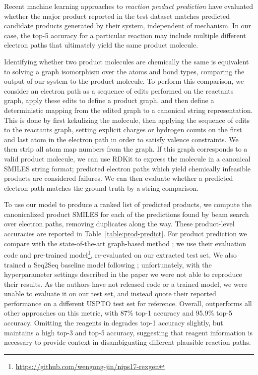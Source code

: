 Recent machine learning approaches to {\em reaction product prediction} \citep{jin2017predicting,schwaller2017found}
have evaluated whether the major product reported in the test dataset matches predicted candidate products generated by their system, independent of mechanism.
In our case, the top-5 accuracy for a particular reaction may include multiple different electron paths that ultimately yield the same product molecule.

Identifying whether two product molecules are chemically the same is equivalent to solving a graph isomorphism over the atoms and bond types, comparing the output of our system to the product molecule.
To perform this comparison, we consider an electron path as a sequence of edits performed on the reactants graph, apply these edits to define a product graph, 
and then define a deterministic mapping from the edited graph to a canonical string representation.
This is done by first kekulizing the molecule, %
then applying the sequence of edits to the reactants graph,
setting explicit charges or hydrogen counts on the first and last atom in the electron path in order to satisfy valence constraints.
We then strip all atom map numbers from the graph.
If this graph corresponds to a valid product molecule, we can use RDKit to express the molecule in a canonical SMILES string format;
predicted electron paths which yield chemically infeasible products are considered failures.
We can then evaluate whether a predicted electron path matches the ground truth by a string comparison.

To use our model to produce a ranked list of predicted products, we compute the canonicalized product SMILES for each of the predictions found by beam search over electron paths, removing duplicates along the way. 
These product-level accuracies are reported in Table~\ref{table:prod-predict}.
For product prediction we compare with the state-of-the-art graph-based method \cite{jin2017predicting};
we use their evaluation code and pre-trained model\footnote{\url{https://github.com/wengong-jin/nips17-rexgen}},
re-evaluated on our extracted test set.%
We also trained a Seq2Seq baseline model following \cite{schwaller2017found};
unfortunately, with the hyperparameter settings described in the paper we were not able to reproduce their results.
As the authors have not released code or a trained model, we were unable to evaluate it on our test set, and instead quote their reported performance on a different USPTO test set for reference.
Overall, \ourModelR outperforms all other approaches on this metric, with 87\% top-1 accuracy and 95.9\% top-5 accuracy.
Omitting the reagents in \ourModelR degrades top-1 accuracy slightly, but maintains a high top-3 and top-5 accuracy,
suggesting that reagent information is necessary to provide context in disambiguating different plausible reaction paths.



